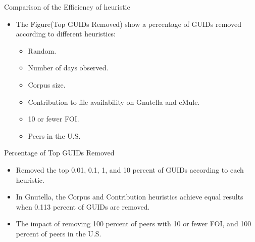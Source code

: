 \documentclass[notes]{beamer}
\begin{document}
\begin{frame}
\begin{block}{Comparison of the Efficiency of heuristic}
\begin{itemize}

\item[\checkmark] The Figure(Top GUIDs Removed) show a percentage of GUIDs removed according to different
heuristics:

\begin{itemize}

\item[\checkmark] Random.
\item[\checkmark] Number of days observed. 
\item[\checkmark] Corpus size.
\item[\checkmark] Contribution to file availability on Gnutella and eMule.
\item[\checkmark] 10 or fewer FOI.
\item[\checkmark] Peers in the U.S.

\end{itemize}
\end{itemize}
\end{block}
\end{frame}
\begin{frame}

\begin{block}{Percentage of Top GUIDs Removed}
\begin{itemize}

\item[\checkmark] Removed the top 0.01, 0.1, 1, and 10 percent of GUIDs according to each heuristic.
\item[\checkmark] In Gnutella, the Corpus and Contribution heuristics achieve equal results when 0.113 percent of GUIDs are removed. 
\item[\checkmark] The impact of removing 100 percent of peers with 10 or fewer
FOI, and 100 percent of peers in the U.S.

\end{itemize}
\end{block}
\end{frame}
\end{document}
